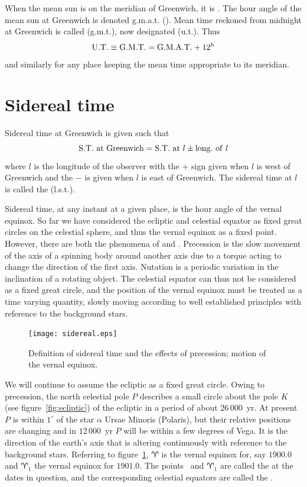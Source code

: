 When the mean sun is on the meridian of Greenwich, it is {}. The hour angle of the mean sun at Greenwich is denoted
	{\sc g.m.a.t.} (). 
Mean time reckoned from midnight at Greenwich is called
{} ({\sc g.m.t.}), now designated {} ({\sc u.t.}). Thus
\[
	{\rm U.T.}\equiv{\rm G.M.T.}={\rm G.M.A.T.}+12^{\mathrm{h}}
\]
and similarly for any place keeping the mean time appropriate to its
meridian. 

\section{Sidereal time}

Sidereal time at Greenwich is given such that
\[
{\rm S.T.~at~Greenwich}={\rm S.T.~at}~l\pm{\rm long.~of~}l
\]
where $l$ is the longitude of the observer with the $+$ sign given
when $l$ is west of Greenwich and the $-$ is given when $l$ is east of
Greenwich. The sidereal time at $l$ is called the {} ({\sc l.s.t.}).

Sidereal time, at any instant at a given place, is the hour angle of the vernal 
equinox. So far we have considered the ecliptic and celestial equator
as fixed great circles on the celestial sphere, and thus the vernal
equinox as a fixed point. However, there are both the phenomena of {} and {}. Precession is the slow movement of the axis of a spinning body around another axis due to a torque acting to change the direction of the first axis.
Nutation is a periodic variation in the inclination of a rotating object. The celestial
equator can thus not be considered 
as a fixed great circle, and the position of the vernal equinox must be treated as
a time varying quantity, slowly moving according to well established principles with
reference to the background stars.

%
\begin{figure}[h]
	\centering
	\texttt{[image: sidereal.eps]}
	\caption{Definition of sidereal time and the effects of precession; motion 
		of the vernal equinox. }
	\label{fig:sidereal}
\end{figure}
%
We will continue to assume the ecliptic as a fixed great circle. Owing to precession, 
the north celestial pole $P$ describes a small circle about the pole $K$ (see 
figure~\ref{fig:ecliptic}) of the ecliptic in a period of about $26\,000$~yr. At 
present $P$ is within $1^\circ$ of the star $\alpha$ Ursae Minoris (Polaris), but 
their relative positions are changing and in $12\,000$~yr  $P$ will be within a few
degrees of Vega. It is the direction of the earth's axis that is altering continuously 
with reference to the background stars. Referring to figure~\ref{fig:sidereal},
$\aries$ is the vernal equinox for, say $1900.0$ and $\aries_1$ the vernal equinox
for $1901.0$. The points \aries\ and $\aries_1$
are called the {} at the dates
in question, and the corresponding celestial equators are called the 
{}. 

